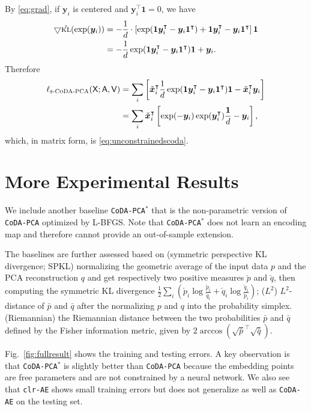 By \eqref{eq:grad}, if $\bm{y}_i$ is centered and $\bm{y}_i^\top\bm{1}=0$, we have
\begin{align*}
\bigtriangledown \check{{\textsc{kl}}}( \exp(\bm{y}_i) )
&= -\frac{1}{d}\cdot \left[\exp(\bm{1}\bm{y}_i^\intercal - \bm{y}_i\bm{1}^\intercal)
+ \bm{1}\bm{y}_i^\intercal - \bm{y}_i\bm{1}^\intercal \right]\bm{1}\nonumber\\
&= -\frac{1}{d} \exp(\bm{1}\bm{y}_i^\intercal - \bm{y}_i\bm{1}^\intercal) \bm{1} + \bm{y}_i.
\end{align*}
Therefore
\begin{align*}
\ell_{\textsc{s-}\textsc{CoDA-PCA}}(\mathsf{X}; \mathsf{A}, \mathsf{V})
&=\sum_i \left[ \check{\bm{x}}_i^\intercal
\frac{1}{d}
\exp(\bm{1}\bm{y}_i^\intercal - \bm{y}_i\bm{1}^\intercal)
\bm{1} - \check{\bm{x}}_i^\intercal \bm{y}_i \right]\nonumber\\
&=\sum_{i} \check{\bm{x}}_i^\intercal
\left[\exp(-\bm{y}_i) \exp(\bm{y}_i^\intercal)\frac{\bm{1}}{d}
- \bm{y}_i\right],
\end{align*}
which, in matrix form, is \eqref{eq:unconstrainedscoda}.

\section{More Experimental Results}

We include another baseline \texttt{CoDA-PCA}$^*$ that is the
non-parametric version of \texttt{CoDA-PCA} optimized by L-BFGS.
Note that \texttt{CoDA-PCA}$^*$ does not learn an encoding map
and therefore cannot provide an out-of-sample extension.

The baselines are further assessed based on 
(symmetric perspective KL divergence; SPKL) normalizing
the geometric average of the input data $p$ and
the PCA reconstruction $q$ and get respectively
two positive measures $\check{p}$ and $\check{q}$, then computing the
symmetric KL divergence
$\frac{1}{2}\sum_{i}\left(\check{p}_i\log\frac{\check{p}_i}{\check{q}_i}+\check{q}_i\log\frac{\check{q}_i}{\check{p}_i}\right)$;
($L^2$) $L^2$-distance of $\bar{p}$ and $\bar{q}$ after the normalizing $p$ and
$q$ into the probability simplex.
(Riemannian) the Riemannian distance between the two probabilities
$\bar{p}$ and $\bar{q}$ defined by the Fisher information metric, given by
$2\arccos\left(\sqrt{\bar{p}}^\top\sqrt{\bar{q}}\right)$.

Fig.~\ref{fig:fullresult} shows the training and testing errors.
A key observation is that 
\texttt{CoDA-PCA}$^*$ is slightly better than \texttt{CoDA-PCA}
because the embedding points are free parameters 
and are not constrained by a neural network.
We also see that
\texttt{clr-AE} shows small training errors but does not
generalize as well as \texttt{CoDA-AE} on the testing set.


